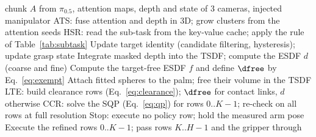 \begin{algorithm}[t]
\caption{One \sys\ step per requested chunk}
\label{alg:proposed}
\begin{algorithmic}[1]
\Require chunk $A$ from $\pi_{0.5}$, attention maps, depth and state of 3 cameras, injected manipulator
\State ATS: fuse attention and depth in 3D; grow clusters from the attention seeds
\State HSR: read the sub-task from the key-value cache; apply the rule of Table~\ref{tab:subtask}
\State Update target identity (candidate filtering, hysteresis); update grasp state
\State Integrate masked depth into the TSDF; compute the ESDF $d$ (coarse and fine)
  \State Compute the target-free ESDF $f$ and define $\dfree$ by Eq.~\eqref{eq:exempt}
\EndIf
{} \State Attach fitted spheres to the palm; free their volume in the TSDF \EndIf
\State LTE: build clearance rows (Eq.~\eqref{eq:clearance}); $\dfree$ for contact links, $d$ otherwise
\State CCR: solve the SQP (Eq.~\eqref{eq:qp}) for rows $0..K{-}1$; re-check on all rows at full resolution
  \State Stop: execute no policy row; hold the measured arm pose
\Else
  \State Execute the refined rows $0..K{-}1$; pass rows $K..H{-}1$ and the gripper through
\EndIf
\end{algorithmic}
\end{algorithm}
